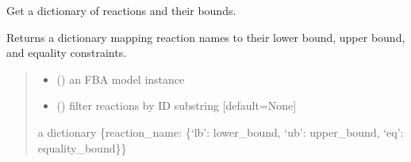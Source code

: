 \documentclass[letterpaper,12pt,english]{sphinxmanual}
\begin{document}

\begin{fulllineitems}
\label{\detokenize{api/core:cbmpy.CBTools.getBoundsDict}}
\pysigstartsignatures
\pysiglinewithargsret
{}
{\sphinxparamcomma {}}
{}
\pysigstopsignatures
\sphinxAtStartPar
Get a dictionary of reactions and their bounds.

\sphinxAtStartPar
Returns a dictionary mapping reaction names to their lower bound, upper bound,
and equality constraints.
\begin{quote}\begin{description}
\begin{itemize}
\item {} 
\sphinxAtStartPar
{} () \textendash{} an FBA model instance

\item {} 
\sphinxAtStartPar
{} (\sphinxstyleliteralemphasis{\sphinxupquote{, }}) \textendash{} filter reactions by ID substring {[}default=None{]}

\end{itemize}

\sphinxAtStartPar
{} \textendash{} a dictionary \{reaction\_name: \{‘lb’: lower\_bound, ‘ub’: upper\_bound, ‘eq’: equality\_bound\}\}

\end{description}\end{quote}

\end{fulllineitems}

\end{document}
